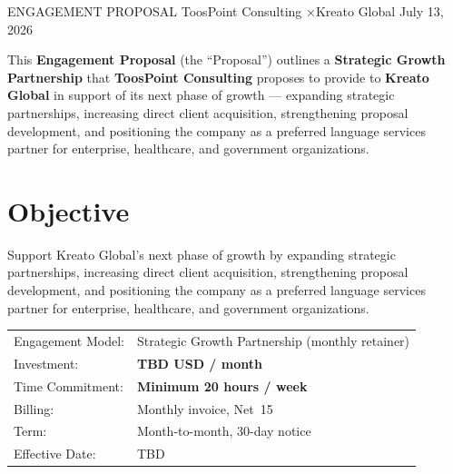 \documentclass{toospoint}
\begin{document}
\contracttitle
  {ENGAGEMENT PROPOSAL}
  {ToosPoint Consulting \quad×\quad Kreato Global}
  {July 13, 2026}

\begin{clausebox}
\sffamily\small
This \textbf{Engagement Proposal} (the ``Proposal'') outlines a
\textbf{Strategic Growth Partnership} that \textbf{ToosPoint Consulting}
proposes to provide to \textbf{Kreato Global} in support of its next phase of
growth --- expanding strategic partnerships, increasing direct client
acquisition, strengthening proposal development, and positioning the company
as a preferred language services partner for enterprise, healthcare, and
government organizations.
\end{clausebox}

\vspace{10pt}

\section{Objective}

Support Kreato Global's next phase of growth by expanding strategic
partnerships, increasing direct client acquisition, strengthening proposal
development, and positioning the company as a preferred language services
partner for enterprise, healthcare, and government organizations.

\vspace{4pt}
\begin{mdframed}[
  linecolor=TPBorder,
  linewidth=1pt,
  roundcorner=4pt,
  backgroundcolor=TPLight,
  innerleftmargin=14pt,
  innerrightmargin=14pt,
  innertopmargin=10pt,
  innerbottommargin=10pt
]
\sffamily\small
\begin{tabular}{@{}p{}p{}@{}}
  \textcolor{TPGray}{Engagement Model:}  & Strategic Growth Partnership (monthly retainer) \\[3pt]
  \textcolor{TPGray}{Investment:}        & \textbf{TBD USD / month} \\[3pt]
  \textcolor{TPGray}{Time Commitment:}   & \textbf{Minimum 20 hours / week} \\[3pt]
  \textcolor{TPGray}{Billing:}           & Monthly invoice, Net~15 \\[3pt]
  \textcolor{TPGray}{Term:}              & Month-to-month, 30-day notice \\[3pt]
  \textcolor{TPGray}{Effective Date:}    & TBD \\
\end{tabular}
\end{mdframed}
\end{document}

